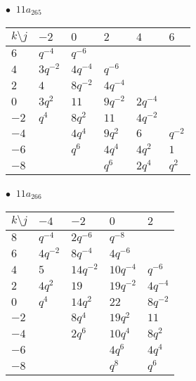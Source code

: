 \begin{minipage}{\linewidth}
$\bullet\ $ $11a_{265}$ \vspace{0.5em} \\
\begin{tabular}{l|lllll}
$k \setminus j$ & $-2$ & $0$ & $2$ & $4$ & $6$ \\
\hline
$6$ & $q^{-4}$ & $q^{-6}$ &  &  &  \\
$4$ & $3q^{-2}$ & $4q^{-4}$ & $q^{-6}$ &  &  \\
$2$ & $4$ & $8q^{-2}$ & $4q^{-4}$ &  &  \\
$0$ & $3q^{2}$ & $11$ & $9q^{-2}$ & $2q^{-4}$ &  \\
$-2$ & $q^{4}$ & $8q^{2}$ & $11$ & $4q^{-2}$ &  \\
$-4$ &  & $4q^{4}$ & $9q^{2}$ & $6$ & $q^{-2}$ \\
$-6$ &  & $q^{6}$ & $4q^{4}$ & $4q^{2}$ & $1$ \\
$-8$ &  &  & $q^{6}$ & $2q^{4}$ & $q^{2}$ \\
\end{tabular}
\vspace{2em}
\end{minipage}
%
\begin{minipage}{\linewidth}
$\bullet\ $ $11a_{266}$ \vspace{0.5em} \\
\begin{tabular}{l|llll}
$k \setminus j$ & $-4$ & $-2$ & $0$ & $2$ \\
\hline
$8$ & $q^{-4}$ & $2q^{-6}$ & $q^{-8}$ &  \\
$6$ & $4q^{-2}$ & $8q^{-4}$ & $4q^{-6}$ &  \\
$4$ & $5$ & $14q^{-2}$ & $10q^{-4}$ & $q^{-6}$ \\
$2$ & $4q^{2}$ & $19$ & $19q^{-2}$ & $4q^{-4}$ \\
$0$ & $q^{4}$ & $14q^{2}$ & $22$ & $8q^{-2}$ \\
$-2$ &  & $8q^{4}$ & $19q^{2}$ & $11$ \\
$-4$ &  & $2q^{6}$ & $10q^{4}$ & $8q^{2}$ \\
$-6$ &  &  & $4q^{6}$ & $4q^{4}$ \\
$-8$ &  &  & $q^{8}$ & $q^{6}$ \\
\end{tabular}
\vspace{2em}
\end{minipage}
%
